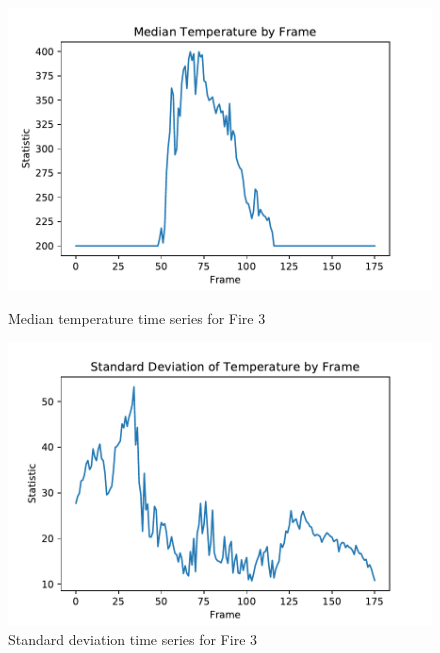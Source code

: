 \documentclass{article}
\begin{document}
\begin{figure}[ht]
\begin{minipage}[b]{0.5\linewidth}
    \includegraphics[width=1.05\linewidth]{../plots/f3_mediantemp.pdf} 
    \caption{Median temperature time series for Fire 3} 
    \vspace{4ex}
  \end{minipage}%
  \begin{minipage}[b]{0.5\linewidth}
    \centering
    \includegraphics[width=1.05\linewidth]{../plots/f3_stdtemp.pdf} 
    \caption{Standard deviation time series for Fire 3} 
    \vspace{4ex}
  \end{minipage} 

\end{figure}
\end{document}

